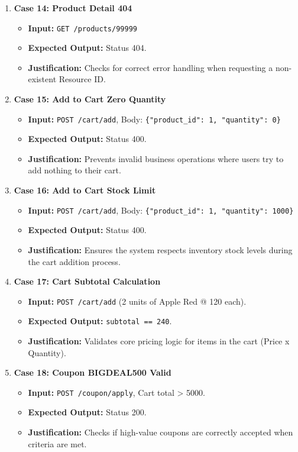 \documentclass{article}
\begin{document}
\begin{enumerate}
    \item \textbf{Case 14: Product Detail 404}
    \begin{itemize}
        \item \textbf{Input:} \texttt{GET /products/99999}
        \item \textbf{Expected Output:} Status 404.
        \item \textbf{Justification:} Checks for correct error handling when requesting a non-existent Resource ID.
    \end{itemize}

    \item \textbf{Case 15: Add to Cart Zero Quantity}
    \begin{itemize}
        \item \textbf{Input:} \texttt{POST /cart/add}, Body: \texttt{\{"product_id": 1, "quantity": 0\}}
        \item \textbf{Expected Output:} Status 400.
        \item \textbf{Justification:} Prevents invalid business operations where users try to add nothing to their cart.
    \end{itemize}

    \item \textbf{Case 16: Add to Cart Stock Limit}
    \begin{itemize}
        \item \textbf{Input:} \texttt{POST /cart/add}, Body: \texttt{\{"product_id": 1, "quantity": 1000\}}
        \item \textbf{Expected Output:} Status 400.
        \item \textbf{Justification:} Ensures the system respects inventory stock levels during the cart addition process.
    \end{itemize}

    \item \textbf{Case 17: Cart Subtotal Calculation}
    \begin{itemize}
        \item \textbf{Input:} \texttt{POST /cart/add} (2 units of Apple Red @ 120 each).
        \item \textbf{Expected Output:} \texttt{subtotal == 240}.
        \item \textbf{Justification:} Validates core pricing logic for items in the cart (Price x Quantity).
    \end{itemize}

    \item \textbf{Case 18: Coupon BIGDEAL500 Valid}
    \begin{itemize}
        \item \textbf{Input:} \texttt{POST /coupon/apply}, Cart total > 5000.
        \item \textbf{Expected Output:} Status 200.
        \item \textbf{Justification:} Checks if high-value coupons are correctly accepted when criteria are met.
    \end{itemize}


\end{enumerate}
\end{document}
